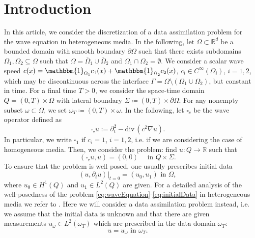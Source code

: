 \documentclass[sn-mathphys-num]{sn-jnl}
\numberwithin{equation}{section}
\renewcommand{\div}{\mathrm{div}\,}  %
\newcommand{\wop}{\square_c}
\newcommand{\dt}{\partial_t}
\begin{document}
\section{Introduction}
\noindent In this article, we consider the discretization of a data assimilation problem for the wave equation in heterogeneous media. In the following, let $\Omega \subset \mathbb{R}^d$ be a bounded domain with smooth boundary $\partial \Omega$ such that there exists subdomains $\Omega_1, \Omega_2 \subseteq \Omega$ such that $\Omega = \overline{\Omega}_1 \cup \overline{\Omega}_2$ and $\Omega_1 \cap \Omega_2 = \emptyset$. We consider a scalar wave speed $c(x) = \mathbbm{1}_{\Omega_1} c_1(x) + \mathbbm{1}_{\Omega_2} c_2(x)$, $c_i \in C^\infty(\Omega_i)$, $i = 1,2$, which may be discontinuous across the interface $\Gamma = \Omega \setminus (\Omega_1 \cup \Omega_2)$, but constant in time. For a final time $T > 0$, we consider the space-time domain $Q = (0,T) \times \Omega$ with lateral boundary $\Sigma \coloneqq (0,T) \times \partial \Omega$. For any nonempty subset $\omega \subset \Omega$, we set $\omega_T \coloneqq (0,T) \times \omega$. In the following, let $\wop$ be the wave operator defined as 
\begin{equation*}
    \wop u := \partial_t^2 - \div(c^2 \nabla u).
\end{equation*}
In particular, we write $\square_1$ if $c_i = 1$, $i = 1,2$, i.e. if we are considering the case of homogeneous media. 
Then, we consider the problem: find $u : Q \rightarrow \mathbb{R}$ such that 
\begin{equation}\label{eq:waveEquation}
        (\wop u, u) = (0,0) \quad \text{ in } Q \times \Sigma.  
\end{equation}
To ensure that the problem is well posed, one usually prescribes initial data
\begin{equation}\label{eq:initialData}
    (u,\dt u) \vert_{t = 0} = (u_0,u_1) \text{ in } \Omega, \tag{IVP} 
\end{equation}
where $u_0 \in H^1(Q)$ and $u_1 \in L^2(Q)$ are given. For a detailed analysis of the well-posedness of the problem \eqref{eq:waveEquation}-\eqref{eq:initialData} in heterogeneous media we refer to \cite{StolkPhD}. 
Here we will consider a data assimilation problem instead, i.e. we assume that the initial data is unknown and that there are given measurements $u_{\omega} \in L^2(\omega_T)$ which are prescribed in the data domain $\omega_T$: 
\begin{equation}\label{eq:dataMatch}
    u = u_{\omega} \text{ in } \omega_T. \tag{DA}
\end{equation}
\end{document}
